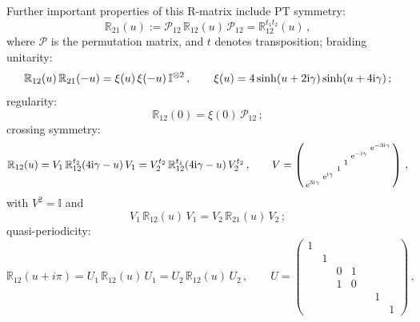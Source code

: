 \documentclass[12pt]{article}
\numberwithin{equation}{section}
\newcommand{\ri}{{\rm i}}
\newcommand{\re}{{\rm e}}
\newcommand{\id}{\mathbb{I}}
\begin{document}
	Further important properties of this R-matrix include PT symmetry:
	\begin{equation}
		\mathbb{R}_{21}(u):= \mathcal{P}_{12}\, \mathbb{R}_{12}(u)\, \mathcal{P}_{12} = \mathbb{R}_{12}^{t_1 t_2}(u)\,, 
		\label{PT}
	\end{equation}
	where $\mathcal{P}$ is the permutation matrix, and $t$ denotes transposition; braiding unitarity:
	\begin{equation}
		\mathbb{R}_{12}(u)\, \mathbb{R}_{21}(-u)=\xi(u)\, \xi(-u)\, \id^{\otimes 2}\,, \qquad \xi(u)=4\sinh(u+2\ri \gamma)\sinh(u+4\ri \gamma)\,;
		\label{unitarityR}
	\end{equation}   
	regularity:
	\begin{equation}    
		\mathbb{R}_{12}(0)=\xi(0)\, \mathcal{P}_{12}\,; \label{Reg}
	\end{equation}
	crossing symmetry:
	\begin{equation}
		\mathbb{R}_{12}(u) = V_1\, \mathbb{R}_{12}^{t_2}(4\ri \gamma-u)\, V_1 
		= V_2^{t_2}\, \mathbb{R}_{12}^{t_1}(4\ri \gamma-u)\, V_2^{t_2}\,, \qquad 
		V = \left(\begin{smallmatrix}
			&  &  &   &  &  \re^{-3\ri \gamma}\\
			&  &  &   &  \re^{-\ri \gamma} & \\
			&  &  &   1 &   &   \\
			&  &  1 &  &    & \\
			&  \re^{\ri \gamma} &  &  &  &   \\
			\re^{3\ri \gamma} &  &  &  &  &  
		\end{smallmatrix}\right) \,,
		\label{crossingR}
	\end{equation}
	with $V^2 = \id$ and 
	\begin{equation}
		V_1\, \mathbb{R}_{12}(u)\, V_1= V_2\, \mathbb{R}_{21}(u)\, V_2 \,;
		\label{Vprop}
	\end{equation}
	quasi-periodicity:
	\begin{equation}
		\mathbb{R}_{12}(u+i\pi) = U_1\, \mathbb{R}_{12}(u)\, U_1 = U_2\, \mathbb{R}_{12}(u)\, U_2\,, \qquad U = \left(\begin{smallmatrix}
			1 & & & & &\\
			& 1 & & & &\\
			& & 0 & 1 & &\\
			& & 1 & 0 & &\\
			& & & & & 1 & \\
			& & & & & & 1
		\end{smallmatrix}\right) \,,
		\label{quasiperiodicity}
	\end{equation}
\end{document}
